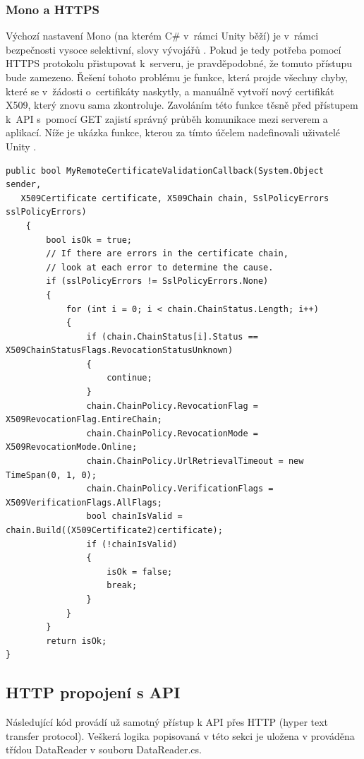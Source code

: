 \documentclass[thesis=B,czech]{FITthesis}[2012/06/26]
\begin{document}
	\subsubsection{Mono a HTTPS}
	
	Výchozí nastavení Mono (na kterém C\# v~rámci Unity běží) je v~rámci bezpečnosti vysoce selektivní, slovy vývojářů  \cite{mono}. Pokud je tedy potřeba pomocí HTTPS protokolu přistupovat k~serveru, je pravděpodobné, že tomuto přístupu bude zamezeno. Řešení tohoto problému je funkce, která projde všechny chyby, které se v~žádosti o~certifikáty naskytly, a manuálně vytvoří nový certifikát X509, který znovu sama zkontroluje. Zavoláním této funkce těsně před přístupem k~API s~pomocí GET zajistí správný průběh komunikace mezi serverem a aplikací. Níže je ukázka funkce, kterou za tímto účelem nadefinovali uživatelé Unity \cite{unityFAQ}.
	
	\begin{lstlisting}[frame=single]
public bool MyRemoteCertificateValidationCallback(System.Object sender,
   X509Certificate certificate, X509Chain chain, SslPolicyErrors sslPolicyErrors)
    {
        bool isOk = true;
        // If there are errors in the certificate chain,
        // look at each error to determine the cause.
        if (sslPolicyErrors != SslPolicyErrors.None)
        {
            for (int i = 0; i < chain.ChainStatus.Length; i++)
            {
                if (chain.ChainStatus[i].Status == X509ChainStatusFlags.RevocationStatusUnknown)
                {
                    continue;
                }
                chain.ChainPolicy.RevocationFlag = X509RevocationFlag.EntireChain;
                chain.ChainPolicy.RevocationMode = X509RevocationMode.Online;
                chain.ChainPolicy.UrlRetrievalTimeout = new TimeSpan(0, 1, 0);
                chain.ChainPolicy.VerificationFlags = X509VerificationFlags.AllFlags;
                bool chainIsValid = chain.Build((X509Certificate2)certificate);
                if (!chainIsValid)
                {
                    isOk = false;
                    break;
                }
            }
        }
        return isOk;
}
	\end{lstlisting}
	
	\subsection{HTTP propojení s API}
	Následující kód provádí už samotný přístup k API přes HTTP (hyper text transfer protocol). Veškerá logika popisovaná v této sekci je uložena v prováděna třídou DataReader v souboru DataReader.cs.
	
\end{document}
